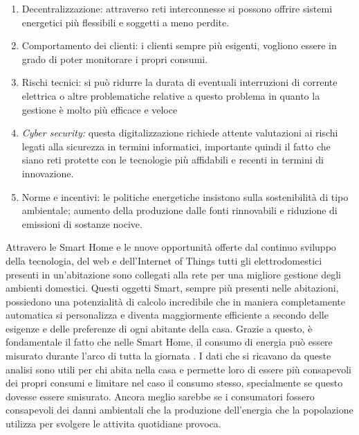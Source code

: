 \begin{enumerate}
\item  Decentralizzazione: attraverso reti interconnesse si possono offrire sistemi energetici pi\`{u} flessibili e soggetti a meno perdite.

\item  Comportamento dei clienti: i clienti sempre pi\`{u} esigenti, vogliono essere in grado di poter monitorare i propri consumi.

\item  Rischi tecnici: si pu\`{o} ridurre la durata di eventuali interruzioni di corrente elettrica o altre problematiche relative a questo problema in quanto la gestione \`{e} molto pi\`{u} efficace e veloce

\item  \textit{Cyber security: }questa digitalizzazione richiede attente valutazioni ai rischi legati alla sicurezza in termini informatici, importante quindi il fatto che siano reti protette con le tecnologie pi\`{u} affidabili e recenti in termini di innovazione.\textit{}

\item \textit{ }Norme e incentivi: le politiche energetiche insistono sulla sostenibilit\`{a} di tipo ambientale; aumento della produzione dalle fonti rinnovabili e riduzione di emissioni di sostanze nocive.
\end{enumerate}
Attravero le Smart Home e le nuove opportunità offerte dal continuo sviluppo della tecnologia, del web e dell’Internet of Things tutti gli elettrodomestici presenti in un’abitazione sono collegati alla rete per una migliore gestione degli ambienti domestici. Questi oggetti Smart, sempre più presenti nelle abitazioni, possiedono una potenzialità di calcolo incredibile che in maniera completamente automatica si personalizza e diventa maggiormente efficiente a secondo delle esigenze e delle preferenze di ogni abitante della casa. Grazie a questo, è fondamentale il fatto che nelle Smart Home, il consumo di energia può essere misurato durante l’arco di tutta la giornata  . I dati che si ricavano da queste analisi sono utili per chi abita nella casa e permette loro di essere più consapevoli dei propri consumi e limitare nel caso il consumo stesso, specialmente se questo dovesse essere smisurato. Ancora meglio sarebbe se i consumatori fossero consapevoli dei danni ambientali che la produzione dell’energia che la popolazione utilizza per svolgere le attivita quotidiane provoca.